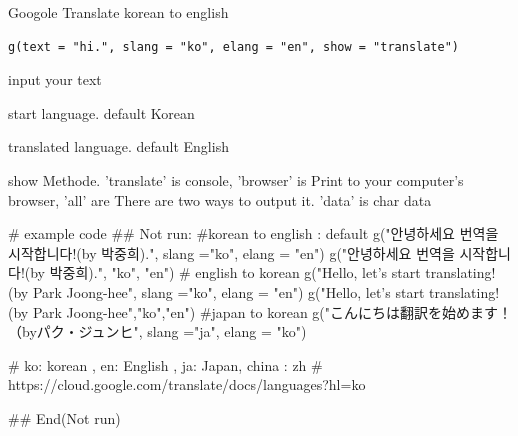 \documentclass[a4paper]{book}
\begin{document}
%
\begin{Description}
Googole Translate korean to english
\end{Description}
%
\begin{Usage}
\begin{verbatim}
g(text = "hi.", slang = "ko", elang = "en", show = "translate")
\end{verbatim}
\end{Usage}
%
\begin{Arguments}
\begin{ldescription}
\item[\code{text}] input your text

\item[\code{slang}] start language. default Korean

\item[\code{elang}] translated language. default English

\item[\code{show}] show Methode. 'translate' is console, 'browser'  is Print to your computer's browser, 'all' are There are two ways to output it. 'data' is char data
\end{ldescription}
\end{Arguments}
%
\begin{Examples}
\begin{ExampleCode}
# example code
\#\# Not run: 
#korean to english : default
g("안녕하세요 번역을 시작합니다!(by 박중희).", slang ="ko", elang = "en")
g("안녕하세요 번역을 시작합니다!(by 박중희).", "ko", "en")
# english to korean
g("Hello, let’s start translating! (by Park Joong-hee", slang ="ko", elang = "en")
g("Hello, let’s start translating! (by Park Joong-hee","ko","en")
#japan to korean
g("こんにちは翻訳を始めます！（byパク・ジュンヒ", slang ="ja", elang = "ko")

# ko: korean , en: English , ja: Japan, china : zh
# https://cloud.google.com/translate/docs/languages?hl=ko

## End(Not run)
\end{ExampleCode}
\end{Examples}
\end{document}
